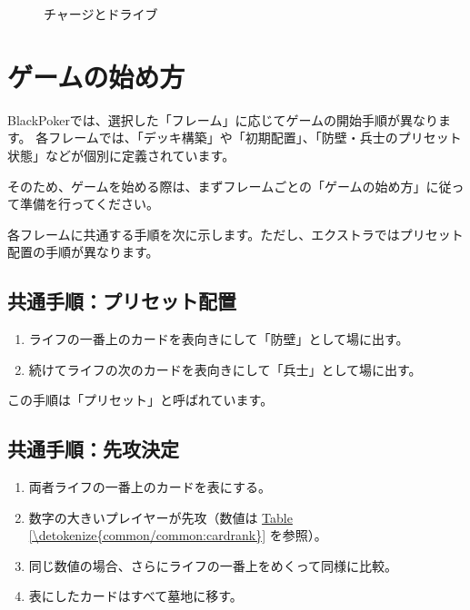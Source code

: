 \documentclass[letterpaper,10pt,dvipdfmx]{sphinxmanual}
\begin{document}
\begin{figure}[htbp]
\centering
\capstart

\noindent{}
\caption{チャージとドライブ}\label{\detokenize{common/common:id47}}\label{\detokenize{common/common:chargedrive}}\end{figure}


\section{ゲームの始め方}
\label{\detokenize{common/common:common-gamestart}}\label{\detokenize{common/common:id13}}
\sphinxAtStartPar
BlackPokerでは、選択した「フレーム」に応じてゲームの開始手順が異なります。
各フレームでは、「デッキ構築」や「初期配置」、「防壁・兵士のプリセット状態」などが個別に定義されています。

\sphinxAtStartPar
そのため、ゲームを始める際は、まずフレームごとの「ゲームの始め方」に従って準備を行ってください。

\sphinxAtStartPar
各フレームに共通する手順を次に示します。ただし、エクストラではプリセット配置の手順が異なります。


\subsection{共通手順：プリセット配置}
\label{\detokenize{common/common:common-gamestart-preset}}\label{\detokenize{common/common:id14}}\begin{enumerate}
%
\item {} 
\sphinxAtStartPar
ライフの一番上のカードを表向きにして「防壁」として場に出す。

\item {} 
\sphinxAtStartPar
続けてライフの次のカードを表向きにして「兵士」として場に出す。

\end{enumerate}

\sphinxAtStartPar
この手順は「プリセット」と呼ばれています。


\subsection{共通手順：先攻決定}
\label{\detokenize{common/common:common-gamestart-first}}\label{\detokenize{common/common:id15}}\begin{enumerate}
%
\item {} 
\sphinxAtStartPar
両者ライフの一番上のカードを表にする。

\item {} 
\sphinxAtStartPar
数字の大きいプレイヤーが先攻（数値は \hyperref[\detokenize{common/common:cardrank}]{Table \ref{\detokenize{common/common:cardrank}}} を参照）。

\item {} 
\sphinxAtStartPar
同じ数値の場合、さらにライフの一番上をめくって同様に比較。

\item {} 
\sphinxAtStartPar
表にしたカードはすべて墓地に移す。

\end{enumerate}
\end{document}
